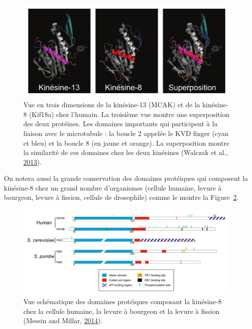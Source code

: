\documentclass[12pt,a4paper,twoside,openright]{book}
\begin{document}
\begin{figure}[htbp]
\centering
\includegraphics{figures/intro/dep_kinesin.png}
\caption[Reconstruction 3D des kinésines dépolymérisatrice]{\label{fig:dep_kinesin}Vue
en trois dimensions de la kinésine-13 (MCAK) et de la kinésine-8
(Kif18a) chez l'humain. La troisième vue montre une superposition des
deux protéines. Les domaines importants qui participent à la liaison
avec le microtubule : la boucle 2 appelée le KVD finger (cyan et bleu)
et la boucle 8 (en jaune et orange). La superposition montre la
similarité de ces domaines chez les deux kinésines (Walczak et al.,
\protect\hyperlink{ref-Walczak2013a}{2013}).}
\end{figure}

On notera aussi la grande conservation des domaines protéiques qui
composent la kinésine-8 chez un grand nombre d'organismes (cellule
humaine, levure à bourgeon, levure à fission, cellule de drosophile)
comme le montre la Figure~\ref{fig:proteicdomain}.

\begin{figure}[htbp]
\centering
\includegraphics{figures/intro/proteicdomain.png}
\caption[Les domaines protéiques des différentes kinésine-8]{\label{fig:proteicdomain}Vue
schématique des domaines protéiques composant la kinésine-8 chez la
cellule humaine, la levure à bourgeon et la levure à fission (Messin and
Millar, \protect\hyperlink{ref-Messin2014}{2014}).}
\end{figure}
\end{document}
